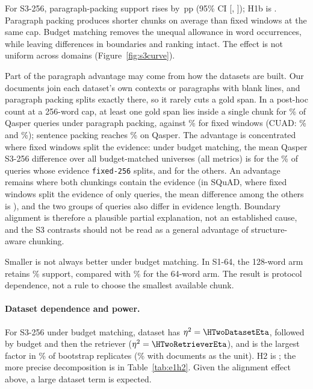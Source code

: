 \documentclass[11pt]{article}
\newcommand{\pp}{\ensuremath{\,\mathrm{pp}}}
\newcommand{\chunk}[1]{\texttt{#1}}
\begin{document}
For S3-256, paragraph-packing support rises by \HOneBEst\pp{} (95\% CI [\HOneBLo, \HOneBHi]); H1b is \HOneBVerdict. Paragraph packing produces shorter chunks on average than fixed windows at the same cap. Budget matching removes the unequal allowance in word occurrences, while leaving differences in boundaries and ranking intact. The effect is not uniform across domains (Figure~\ref{fig:s3curve}).

Part of the paragraph advantage may come from how the datasets are built. Our documents join each dataset's own contexts or paragraphs with blank lines, and paragraph packing splits exactly there, so it rarely cuts a gold span. In a post-hoc count at a 256-word cap, at least one gold span lies inside a single chunk for \ContainParagraphQasper\% of Qasper queries under paragraph packing, against \ContainFixedQasper\% for fixed windows (CUAD: \ContainParagraphCuad\% and \ContainFixedCuad\%); sentence packing reaches \ContainSentenceQasper\% on Qasper. The advantage is concentrated where fixed windows split the evidence: under budget matching, the mean Qasper S3-256 difference over all budget-matched universes (all metrics) is \QasperSplitDelta{} for the \QasperSplitShare\% of queries whose evidence \chunk{fixed-256} splits, and \QasperContainedDelta{} for the others. An advantage remains where both chunkings contain the evidence (in SQuAD, where fixed windows split the evidence of only \SquadSplitN{} queries, the mean difference among the others is \SquadContainedDelta), and the two groups of queries also differ in evidence length. Boundary alignment is therefore a plausible partial explanation, not an established cause, and the S3 contrasts should not be read as a general advantage of structure-aware chunking.

Smaller is not always better under budget matching. In S1-64, the 128-word arm retains \SoneSixFourBudgetB\% support, compared with \SoneSixFourBudgetA\% for the 64-word arm. The result is protocol dependence, not a rule to choose the smallest available chunk.

\paragraph{Dataset dependence and power.}
For S3-256 under budget matching, dataset has $\eta^2=\HTwoDatasetEta$, followed by budget and then the retriever ($\eta^2=\HTwoRetrieverEta$), and is the largest factor in \HTwoFraction\% of bootstrap replicates (\HTwoDocFraction\% with documents as the unit). H2 is \HTwoVerdict; the more precise decomposition is in Table~\ref{tab:e1h2}. Given the alignment effect above, a large dataset term is expected.
\end{document}
